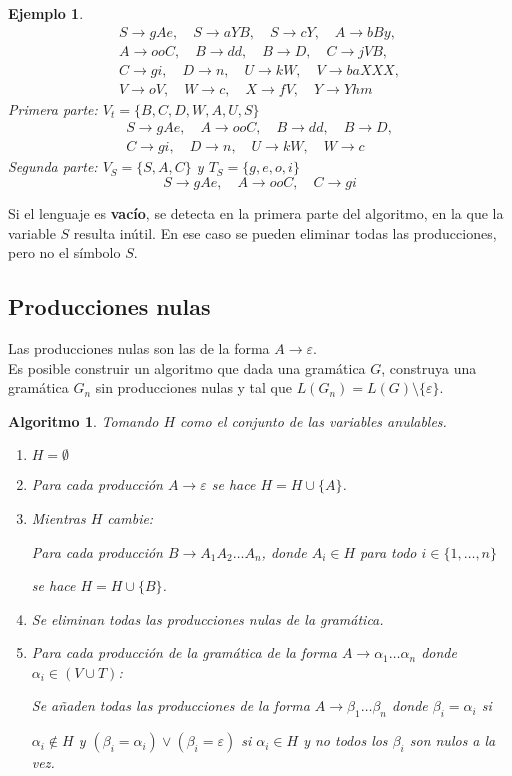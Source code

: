 \documentclass[11pt,titlepage,a4paper]{article}
\theoremstyle{ejemplo}
\newtheorem*{eje}{Ejemplo} %
\theoremstyle{algoritmo}
\newtheorem*{alg}{Algoritmo} %
\begin{document}
\begin{eje}
\begin{gather*}
S\to gAe,\quad S\to aYB,\quad S\to cY,\quad A\to bBy, \\
% 
A\to ooC,\quad B\to dd,\quad B\to D,\quad C\to jVB, \\
%
C\to gi,\quad D\to n,\quad U\to kW,\quad V\to baXXX, \\
%
V\to oV,\quad W\to c,\quad X\to fV,\quad Y\to Yhm
\end{gather*}
Primera parte: $V_t=\{B,C,D,W,A,U,S\}$
\begin{gather*}
S\to gAe,\quad A\to ooC,\quad B\to dd,\quad B\to D, \\
%
C\to gi,\quad D\to n,\quad U\to kW, \quad W\to c
\end{gather*}
Segunda parte: $V_S=\{S,A,C\}$ y $T_S=\{g,e,o,i\}$
$$ S\to gAe,\quad A\to ooC,\quad C\to gi $$
\end{eje}

Si el lenguaje es \textbf{vacío}, se detecta en la primera parte del algoritmo,
en la que la variable $S$ resulta inútil. En ese caso se pueden eliminar todas
las producciones, pero no el símbolo $S$.

\subsection{Producciones nulas}

Las producciones nulas son las de la forma $A\to\varepsilon$.
\\

Es posible construir un algoritmo que dada una gramática $G$, construya una
gramática $G_n$ sin producciones nulas y tal que $L(G_n)=L(G)\setminus
\{\varepsilon\}$.

\begin{alg}
Tomando $H$ como el conjunto de las variables anulables.
\begin{enumerate}[noitemsep]
	\item $H=\emptyset$
	\item Para cada producción $A\to\varepsilon$ se hace $H=H\cup\{A\}$.
	\item Mientras $H$ cambie:
	
	\quad\quad Para cada producción $B\to A_1A_2\dots A_n$, donde $A_i\in H$
	para todo $i\in\{1,\dots,n\}$
	
	\quad\quad se hace $H=H\cup\{B\}$.
	\item Se eliminan todas las producciones nulas de la gramática.
	\item Para cada producción de la gramática de la forma $A\to\alpha_1\dots
	\alpha_n$ donde $\alpha_i\in(V\cup T)$:
	
	\quad\quad Se añaden todas las producciones de la forma $A\to\beta_1\dots
	\beta_n$ donde $\beta_i=\alpha_i$ si
	
	\quad\quad $\alpha_i\notin H$ y $(\beta_i=\alpha_i)\vee(\beta_i=\varepsilon)
	$ si $\alpha_i\in H$ y no todos los $\beta_i$ son nulos a la vez.
\end{enumerate}
\end{alg}
\end{document}
